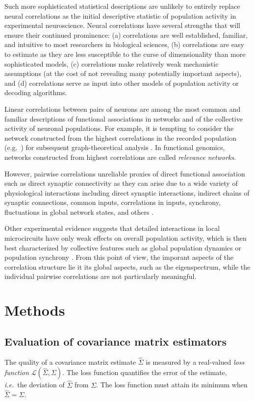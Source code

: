 \documentclass[10pt]{article}
\newcommand{\loss}[1]{\mathcal L\left(#1\right)}
\begin{document}
Such more sophisticated statistical descriptions are unlikely to entirely replace neural correlations as the initial descriptive statistic of population activity in experimental neuroscience. Neural correlations have several strengths that will ensure their continued prominence: (a) correlations are well established, familiar, and intuitive to most researchers in biological sciences, (b) correlations are easy to estimate as they are less susceptible to the curse of dimensionality than more sophisticated models, (c) correlations make relatively weak mechanistic assumptions (at the cost of not revealing many potentially important aspects), and (d) correlations serve as input into other models of population activity or decoding algorithms. 

Linear correlations between pairs of neurons are among the most common and familiar descriptions of functional associations in networks and of the collective activity of neuronal populations.  For example, it is tempting to consider the network constructed from the highest correlations in the recorded population (e.g.~\cite{Malmersjo:2013}) for subsequent graph-theoretical analysis \cite{Feldt:2011}.  In functional genomics, networks constructed from highest correlations are called \emph{relevance networks}.

However, pairwise correlations unreliable proxies of direct functional association such as direct synaptic connectivity as they can arise due to a wide variety of physiological interactions including direct synaptic interactions, indirect chains of synaptic connections, common inputs, correlations in inputs, synchrony, fluctuations in global network states, and others \cite{Shadlen:1998,Ostojic:2009,Pernice:2011,Schneidman:2006}.

Other experimental evidence suggests that detailed interactions in local microcircuits have only weak effects on overall population activity, which is then best characterized by collective features such as global population dynamics or population synchrony \cite{Okun:2012,Tkacik:2012,Tkacik:2013}.  From this point of view, the imporant aspects of the correlation structure lie it its global aspects, such as the eigenspectrum, while the individual pairwise correlations are not particularly meaningful.

\section*{Methods}
\subsection*{Evaluation of covariance matrix estimators}
The quality of a covariance matrix estimate $\hat\Sigma$ is measured by a real-valued \emph{loss function} $\loss{\hat\Sigma,\Sigma}$.  
The loss function quantifies the error of the estimate, \emph{i.e.}~the deviation of $\hat\Sigma$ from $\Sigma$. The loss function must attain its minimum  when $\hat\Sigma = \Sigma$.  
\end{document}
